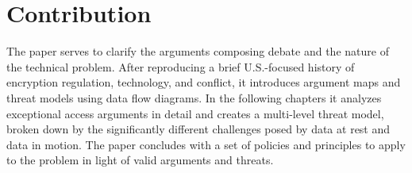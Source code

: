 \section{Contribution}

The paper serves to clarify the arguments composing debate and the nature of the technical problem. After reproducing a
brief U.S.-focused history of encryption regulation, technology, and conflict, it introduces argument maps and threat
models using data flow diagrams. In the following chapters it analyzes exceptional access arguments in detail and
creates a multi-level threat model, broken down by the significantly different challenges posed by data at rest and data
in motion. The paper concludes with a set of policies and principles to apply to the problem in light of valid arguments
and threats.


